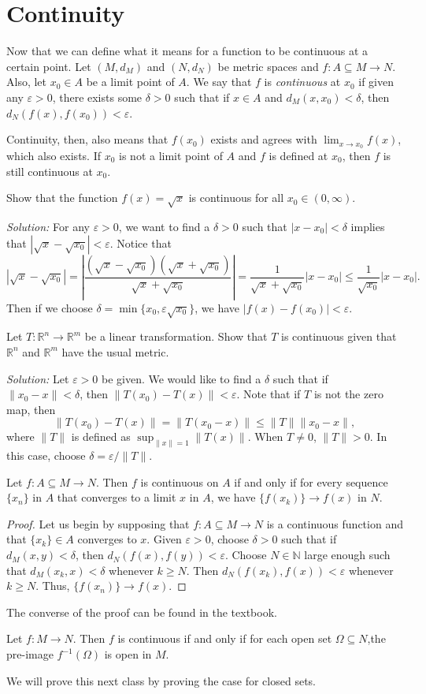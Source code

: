 \documentclass[11pt]{article}
\theoremstyle{definition}
\newcommand{\R}{\mathbb{R}}                      %
\newcommand{\N}{\mathbb{N}}
\begin{document}
\section{Continuity}

Now that we can define what it means for a function to be continuous at a certain point.
 Let $(M,d_M)$ and $(N,d_N)$ be metric spaces and $f:A\subseteq M\to N$. Also, let $x_0\in A$ be a limit point of $A$. We say that $f$ is \textit{continuous} at $x_0$ if given any $\varepsilon>0$, there exists some $\delta>0$ such that if $x\in A$ and $d_M(x,x_0)<\delta$, then $d_N(f(x),f(x_0))<\varepsilon$.

\note Continuity, then, also means that $f(x_0)$ exists and agrees with $\lim_{x\to x_0} f(x)$, which also exists. If $x_0$ is not a limit point of $A$ and $f$ is defined at $x_0$, then $f$ is still continuous at $x_0$.

\ex Show that the function $f(x)=\sqrt{x}$ is continuous for all $x_0\in(0,\infty)$.

\textit{Solution:} For any $\varepsilon>0$, we want to find a $\delta>0$ such that $|x-x_0|<\delta$ implies that $|\sqrt{x}-\sqrt{x_0}|<\varepsilon$. Notice that
$$
|\sqrt{x}-\sqrt{x_0}|=\left|\frac{(\sqrt{x}-\sqrt{x_0})(\sqrt{x}+\sqrt{x_0})}{\sqrt{x}+\sqrt{x_0}}\right|=\frac{1}{\sqrt{x}+\sqrt{x_0}}|x-x_0|\leq \frac{1}{\sqrt{x_0}}|x-x_0|.
$$
Then if we choose $\delta=\min\{x_0,\varepsilon\sqrt{x_0}\}$, we have $|f(x)-f(x_0)|<\varepsilon$.

\ex Let $T:\R^n\to\R^m$ be a linear transformation. Show that $T$ is continuous given that $\R^n$ and $\R^m$ have the usual metric.

\textit{Solution:} Let $\varepsilon>0$ be given. We would like to find a $\delta$ such that if $\|x_0-x\|<\delta$, then $\|T(x_0)-T(x)\|<\varepsilon$. Note that if $T$ is not the zero map, then 
$$
\|T(x_0)-T(x)\|=\|T(x_0-x)\|\leq \|T\|\|x_0-x\|,
$$
where $\|T\|$ is defined as $\sup_{\|x\|= 1}\|T(x)\|$. When $T\neq 0$, $\|T\|>0$. In this case, choose $\delta=\varepsilon/\|T\|$.

\prop Let $f:A\subseteq M\to N$. Then $f$ is continuous on $A$ if and only if for every sequence $\{x_n\}$ in $A$ that converges to a limit $x$ in $A$, we have $\{f(x_k)\}\to f(x)$ in $N$. 

\begin{proof}
    Let us begin by supposing that $f:A\subseteq M\to N$ is a continuous function and that $\{x_k\}\in A$ converges to $x$. Given $\varepsilon>0$, choose $\delta>0$ such that if $d_M(x,y)<\delta$, then $d_N(f(x),f(y))<\varepsilon$. Choose $N\in \N$  large enough such that $d_M(x_k,x)<\delta$ whenever $k\geq N$. Then $d_N(f(x_k),f(x))<\varepsilon$ whenever $k\geq N$. Thus, $\{f(x_n)\}\to f(x)$.
\end{proof}
The converse of the proof can be found in the textbook.

\prop Let $f:M\to N$. Then $f$ is continuous if and only if for each open set $\Omega\subseteq N$,the pre-image $f^{-1}(\Omega)$ is open in $M$.

We will prove this next class by proving the case for closed sets.
\end{document}

